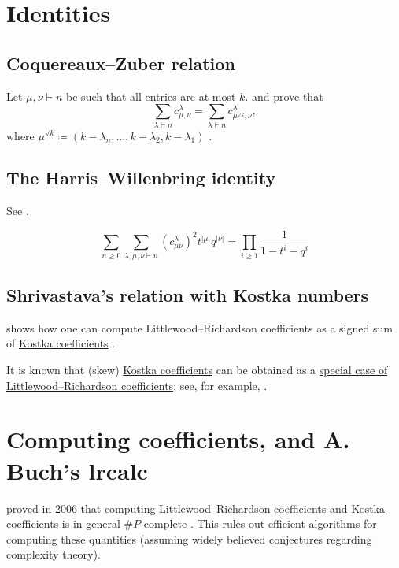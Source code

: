 \section[lrIdentities]{Identities}


\subsection[lrCoquereauxZuber]{Coquereaux--Zuber relation}

Let $\mu, \nu \vdash n$ be such that all entries are at most $k$.
 and  prove that
\[
 \sum_{\lambda \vdash n} c^{\lambda}_{\mu, \nu} =
 \sum_{\lambda \vdash n} c^{\lambda}_{\mu^{\vee k}, \nu},
\]
where $\mu^{\vee k} \coloneqq (k-\lambda_n,\dotsc,k-\lambda_2,k-\lambda_1)$
\cite{CoquereauxZuber2011}.



\subsection[harrisWillenbring]{The Harris--Willenbring identity}

See \cite{HarrisWillenbring2014}.

\[
 \sum_{n \geq 0}
 \sum_{\lambda,\mu, \nu \vdash n}
 \left( c^{\lambda}_{\mu\nu} \right)^2
 t^{|\mu|}q^{|\nu|}
 =
 \prod_{i \geq 1} \frac{1}{1-t^i-q^i}
\]



\subsection[lrShrivastava]{Shrivastava's relation with Kostka numbers}

 shows how one can compute
Littlewood--Richardson coefficients as a signed sum of
\hyperref[kostkaCoefficient]{Kostka coefficients} \cite{Shrivastava2022x}.

It is known that (skew) \hyperref[kostkaCoefficient]{Kostka coefficients}
can be obtained as a
\hyperref[kostkaFromLR]{special case of Littlewood--Richardson coefficients};
see, for example, \cite[p.~338, Eq.~7.61]{StanleyEC2}.




\section[lrcalc]{Computing coefficients, and A. Buch's lrcalc}

 proved in 2006 that computing
Littlewood--Richardson coefficients and
\hyperref[kostkaCoefficient]{Kostka coefficients} is in general
$\#P$-complete \cite{Narayanan2006}.
This rules out efficient algorithms for computing these quantities
(assuming widely believed conjectures regarding complexity theory).

